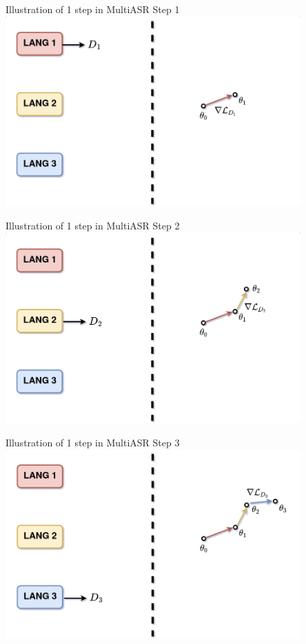 \documentclass{beamer}
\begin{document}
\begin{frame}[t]{Illustration of 1 step in MultiASR}
  Step 1 
  \center \includegraphics[width=0.85\textwidth]{fig/multi_step1.png}
\end{frame}

\begin{frame}[t]{Illustration of 1 step in MultiASR}
  Step 2 
  \center \includegraphics[width=0.85\textwidth]{fig/multi_step2.png}
\end{frame}

\begin{frame}[t]{Illustration of 1 step in MultiASR}
  Step 3 
  \center \includegraphics[width=0.85\textwidth]{fig/multi_step3.png}
\end{frame}
\end{document}
